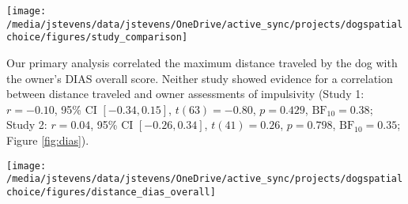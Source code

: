 \documentclass[
  pub,floatsintext]{apa6}
\begin{document}
\begin{figure*}

{\centering \texttt{[image: /media/jstevens/data/jstevens/OneDrive/active\_sync/projects/dogspatialchoice/figures/study\_comparison]} 

}

\caption{Distance traveled, DIAS overall score, and dog age across studies. Individual data points and summary statistics are shown for (a) distance traveled, (b) DIAS overall score, and (c) dog age for the Brady et al. (2018) and current studies. Colored dots represent individual dog data points, filled shapes represent density distributions, black dots and error bars represent mean and 95\% confidence intervals, boxes represent interquartile range, lines within boxes represent medians, and whiskers represent 1.5 times the interquartile range.}\label{fig:study-comp}
\end{figure*}

Our primary analysis correlated the maximum distance traveled by the dog with the owner's DIAS overall score. Neither study showed evidence for a correlation between distance traveled and owner assessments of impulsivity (Study 1: \(r = -0.10\), 95\% CI \([-0.34, 0.15]\), \(t(63) = -0.80\), \(p = 0.429\), \(\mathrm{BF}_{\textrm{10}} = 0.38\); Study 2: \(r = 0.04\), 95\% CI \([-0.26, 0.34]\), \(t(41) = 0.26\), \(p = 0.798\), \(\mathrm{BF}_{\textrm{10}} = 0.35\); Figure \ref{fig:dias}).

\begin{figure*}

{\centering \texttt{[image: /media/jstevens/data/jstevens/OneDrive/active\_sync/projects/dogspatialchoice/figures/distance\_dias\_overall]} 

}

\caption{Relationship between distance traveled and DIAS overall score. Scatterplots of distance traveled and DIAS overall score for (a) Study 1 and (b) Study 2 showed no evidence for a correlation. Dots represent individual dog data points, lines represent best fitting linear regression models, and bands represent 95\% confidence intervals around the regression model.}\label{fig:dias}
\end{figure*}
\end{document}
